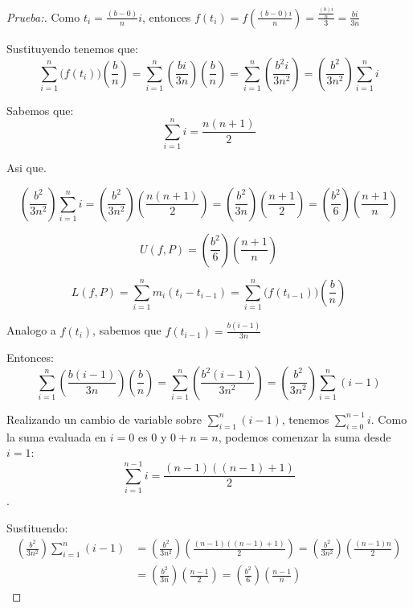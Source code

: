 \documentclass[12pt]{article}
\begin{document}
\begin{enumerate}[\hspace{9px} a)]
\begin{proof}[Prueba:]
            Como \(t_i=\displaystyle\frac{(b-0)}{n}i\), entonces \(f(t_i)=f\left(\displaystyle\frac{(b-0)i}{n}\right) = \frac{\frac{(b)i}{n}}{3} = \frac{bi}{3n}\)

            Sustituyendo tenemos que:
            \begin{equation*}
                \sum_{i=1}^n \big(f(t_i)\big)\left(\displaystyle\frac{b}{n}\right) = \sum_{i=1}^n \left(\frac{bi}{3n}\right)\left(\displaystyle\frac{b}{n}\right) = \sum_{i=1}^n \left(\frac{b^2i}{3n^2}\right) = \left(\frac{b^2}{3n^2}\right) \sum_{i=1}^n i
            \end{equation*}

            Sabemos que: \[\sum_{i=1}^n i = \frac{n(n+1)}{2}\]

            Asi que.

            \begin{equation*}
                \left(\frac{b^2}{3n^2}\right) \sum_{i=1}^n i = \left(\frac{b^2}{3n^2}\right)\left(\frac{n(n+1)}{2}\right) = \left(\frac{b^2}{3n}\right)\left(\frac{n+1}{2}\right) =\left(\frac{b^2}{6}\right)\left(\frac{n+1}{n}\right)
            \end{equation*}

            \[U(f,P)=\left(\frac{b^2}{6}\right)\left(\frac{n+1}{n}\right)\]

            \begin{equation*}%
                L(f,P)=\sum_{i=1}^n m_i(t_i-t_{i-1}) = \sum_{i=1}^n \big(f(t_{i-1})\big)\left(\displaystyle\frac{b}{n}\right)
            \end{equation*}

            Analogo a \(f(t_i)\), sabemos que \(f(t_{i-1})=\displaystyle\frac{b(i-1)}{3n}\)

            Entonces:
            \begin{equation*}
                \sum_{i=1}^n \left(\frac{b(i-1)}{3n}\right)\left(\displaystyle\frac{b}{n}\right) = \sum_{i=1}^n \left(\frac{b^2(i-1)}{3n^2}\right) = \left(\frac{b^2}{3n^2}\right)\sum_{i=1}^n (i-1)
            \end{equation*}

            Realizando un cambio de variable sobre \(\sum_{i=1}^n (i-1)\), tenemos \(\sum_{i=0}^{n-1} i\). Como la suma evaluada en $i=0$ es 0 y \(0+n=n\), podemos comenzar la suma desde \(i=1\): \[\sum_{i=1}^{n-1} i = \displaystyle\frac{(n-1)((n-1)+1)}{2}\].

            Sustituendo:
            \begin{align*}
                \left(\frac{b^2}{3n^2}\right)\sum_{i=1}^n (i-1) &= \left(\frac{b^2}{3n^2}\right)\left(\frac{(n-1)((n-1)+1)}{2}\right) = \left(\frac{b^2}{3n^2}\right)\left(\frac{(n-1)n}{2}\right) \\ &= \left(\frac{b^2}{3n}\right)\left(\frac{n-1}{2}\right) = \left(\frac{b^2}{6}\right)\left(\frac{n-1}{n}\right)
            \end{align*}


\end{proof}
\end{enumerate}
\end{document}
